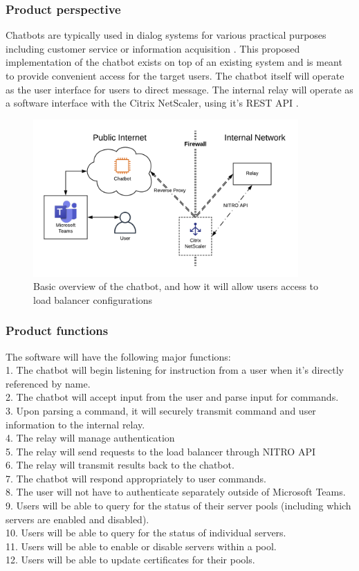 \documentclass[onecolumn, draftclsnofoot,10pt, compsoc]{IEEEtran}
\begin{document}
\subsubsection{Product perspective}
Chatbots are typically used in dialog systems for various practical purposes including customer service or information acquisition \cite{chatbot}.
This proposed implementation of the chatbot exists on top of an existing system and is meant to provide convenient access for the target users.
The chatbot itself will operate as the user interface for users to direct message.
The internal relay will operate as a software interface with the Citrix NetScaler, using it's REST API \cite{citrixnitro}.
\begin{figure}[h]
    \centering
    \includegraphics[height=6cm]{overview.png}
    \caption[Basic overview of the chatbot]{Basic overview of the chatbot, and how it will allow users access to load balancer configurations}
    \label{fig:NetScaler Chatbot}
\end{figure}

\subsubsection{Product functions}
The software will have the following major functions:
\\1. The chatbot will begin listening for instruction from a user when it's directly referenced by name.
\\2. The chatbot will accept input from the user and parse input for commands.
\\3. Upon parsing a command, it will securely transmit command and user information to the internal relay.
\\4. The relay will manage authentication
\\5. The relay will send requests to the load balancer through NITRO API
\\6. The relay will transmit results back to the chatbot.
\\7. The chatbot will respond appropriately to user commands.
\\8. The user will not have to authenticate separately outside of Microsoft Teams.
\\9. Users will be able to query for the status of their server pools (including which servers are enabled and disabled).
\\10. Users will be able to query for the status of individual servers.
\\11. Users will be able to enable or disable servers within a pool.
\\12. Users will be able to update certificates for their pools.
\end{document}

